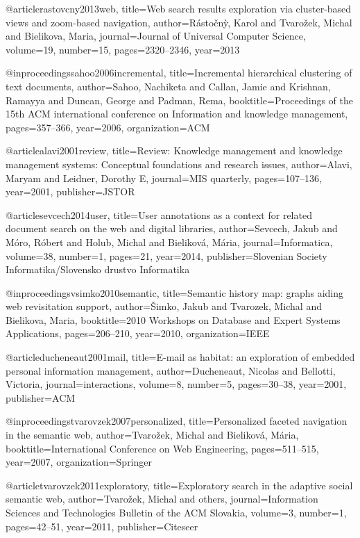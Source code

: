 @article{rastovcny2013web,
  title={Web search results exploration via cluster-based views and zoom-based navigation},
  author={R{\'a}sto{\v{c}}n{\`y}, Karol and Tvaro{\v{z}}ek, Michal and Bielikova, Maria},
  journal={Journal of Universal Computer Science},
  volume={19},
  number={15},
  pages={2320--2346},
  year={2013}
}

@inproceedings{sahoo2006incremental,
  title={Incremental hierarchical clustering of text documents},
  author={Sahoo, Nachiketa and Callan, Jamie and Krishnan, Ramayya and Duncan, George and Padman, Rema},
  booktitle={Proceedings of the 15th ACM international conference on Information and knowledge management},
  pages={357--366},
  year={2006},
  organization={ACM}
}

@article{alavi2001review,
  title={Review: Knowledge management and knowledge management systems: Conceptual foundations and research issues},
  author={Alavi, Maryam and Leidner, Dorothy E},
  journal={MIS quarterly},
  pages={107--136},
  year={2001},
  publisher={JSTOR}
}

@article{sevcech2014user,
  title={User annotations as a context for related document search on the web and digital libraries},
  author={Sevcech, Jakub and M{\'o}ro, R{\'o}bert and Holub, Michal and Bielikov{\'a}, M{\'a}ria},
  journal={Informatica},
  volume={38},
  number={1},
  pages={21},
  year={2014},
  publisher={Slovenian Society Informatika/Slovensko drustvo Informatika}
}

@inproceedings{vsimko2010semantic,
  title={Semantic history map: graphs aiding web revisitation support},
  author={{\v{S}}imko, Jakub and Tvarozek, Michal and Bielikova, Maria},
  booktitle={2010 Workshops on Database and Expert Systems Applications},
  pages={206--210},
  year={2010},
  organization={IEEE}
}

@article{ducheneaut2001mail,
  title={E-mail as habitat: an exploration of embedded personal information management},
  author={Ducheneaut, Nicolas and Bellotti, Victoria},
  journal={interactions},
  volume={8},
  number={5},
  pages={30--38},
  year={2001},
  publisher={ACM}
}

@inproceedings{tvarovzek2007personalized,
  title={Personalized faceted navigation in the semantic web},
  author={Tvaro{\v{z}}ek, Michal and Bielikov{\'a}, M{\'a}ria},
  booktitle={International Conference on Web Engineering},
  pages={511--515},
  year={2007},
  organization={Springer}
}

@article{tvarovzek2011exploratory,
  title={Exploratory search in the adaptive social semantic web},
  author={Tvaro{\v{z}}ek, Michal and others},
  journal={Information  Sciences and Technologies Bulletin of the ACM Slovakia},
  volume={3},
  number={1},
  pages={42--51},
  year={2011},
  publisher={Citeseer}
}

